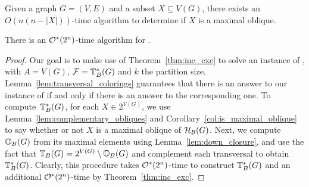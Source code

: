 \begin{corollary}
    \label{col:is_maximal_oblique}
    Given a graph $G = (V, E)$ and a subset $X \subseteq V(G)$, there exists an $O(n(n - |X|))$-time algorithm to determine if $X$ is a maximal oblique.
\end{corollary}

\begin{theorem}
    \label{thm:exact_biclique}
    There is an $\mathcal{O}^*\!\left(2^n\right)$-time algorithm for .
\end{theorem}

\begin{proof}
    Our goal is to make use of Theorem~\ref{thm:inc_exc} to solve an instance of , with $A = V(G)$, $\mathcal{F} = \mathbb{T}^*_{B}(G)$ and $k$ the partition size.
    Lemma~\ref{lem:transversal_colorings} guarantees that there is an answer to our instance of  if and only if there is an answer to the corresponding  one.
    To compute~$\mathbb{T}^*_{B}(G)$, for each $X \in 2^{V(G)}$, we use Lemma~\ref{lem:complementary_obliques} and Corollary~\ref{col:is_maximal_oblique} to say whether or not $X$ is a maximal oblique of $\mathcal{H}_{\mathcal{B}}(G)$.
    Next, we compute $\mathbb{O}_{B}(G)$ from its maximal elements using Lemma~\ref{lem:down_closure}, and use the fact that $\mathbb{T}_{B}(G) = 2^{V(G)} \setminus \mathbb{O}_{B}(G)$ and complement each transversal to obtain $\mathbb{T}^*_{B}(G)$.
    Clearly, this procedure takes $\mathcal{O}^*\!\left(2^n\right)$-time to construct $\mathbb{T}^*_{B}(G)$ and an additional $\mathcal{O}^*\!\left(2^n\right)$-time by Theorem~\ref{thm:inc_exc}.
\end{proof}
